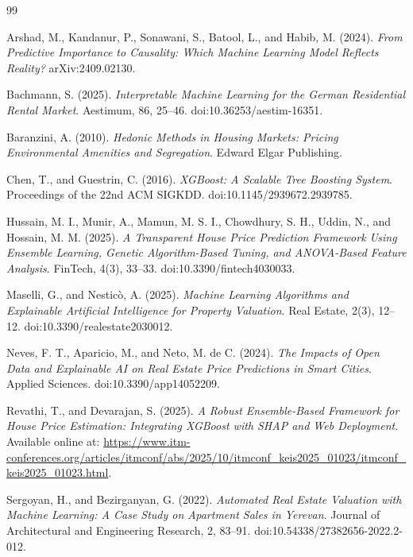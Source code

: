 \documentclass[12pt,a4paper,oneside,openany]{book}
\begin{document}
\clearpage
{}
\begin{thebibliography}{99}
\setlength{\itemsep}{0pt}

Arshad, M., Kandanur, P., Sonawani, S., Batool, L., and Habib, M. (2024).
\textit{From Predictive Importance to Causality: Which Machine Learning Model Reflects Reality?}
arXiv:2409.02130.

Bachmann, S. (2025).
\textit{Interpretable Machine Learning for the German Residential Rental Market}.
Aestimum, 86, 25–46. doi:10.36253/aestim-16351.

Baranzini, A. (2010).
\textit{Hedonic Methods in Housing Markets: Pricing Environmental Amenities and Segregation}.
Edward Elgar Publishing.

Chen, T., and Guestrin, C. (2016).
\textit{XGBoost: A Scalable Tree Boosting System}.
Proceedings of the 22nd ACM SIGKDD. doi:10.1145/2939672.2939785.

Hussain, M. I., Munir, A., Mamun, M. S. I., Chowdhury, S. H., Uddin, N., and Hossain, M. M. (2025).
\textit{A Transparent House Price Prediction Framework Using Ensemble Learning, Genetic Algorithm-Based Tuning, and ANOVA-Based Feature Analysis}.
FinTech, 4(3), 33–33. doi:10.3390/fintech4030033.

Maselli, G., and Nesticò, A. (2025).
\textit{Machine Learning Algorithms and Explainable Artificial Intelligence for Property Valuation}.
Real Estate, 2(3), 12–12. doi:10.3390/realestate2030012.

Neves, F. T., Aparicio, M., and Neto, M. de C. (2024).
\textit{The Impacts of Open Data and Explainable AI on Real Estate Price Predictions in Smart Cities}.
Applied Sciences. doi:10.3390/app14052209.

Revathi, T., and Devarajan, S. (2025).
\textit{A Robust Ensemble-Based Framework for House Price Estimation: Integrating XGBoost with SHAP and Web Deployment}.
Available online at: \url{https://www.itm-conferences.org/articles/itmconf/abs/2025/10/itmconf_keis2025_01023/itmconf_keis2025_01023.html}.

Sergoyan, H., and Bezirganyan, G. (2022).
\textit{Automated Real Estate Valuation with Machine Learning: A Case Study on Apartment Sales in Yerevan}.
Journal of Architectural and Engineering Research, 2, 83–91. doi:10.54338/27382656-2022.2-012.


\end{thebibliography}
\end{document}
